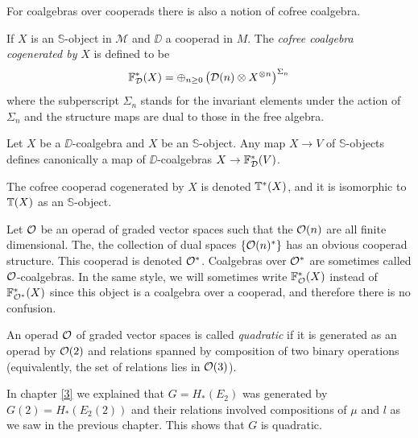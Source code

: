 \documentclass[TFM.tex]{subfiles}
\begin{document}
For coalgebras over cooperads there is also a notion of cofree coalgebra. 

\begin{defi}
If $X$ is an $\mathbb{S}$-object in $\mathscr{M}$ and $\DD$ a cooperad in $M$. The \emph{cofree coalgebra cogenerated by }$X$ is defined to be
\[
\mathbb{F}^*_{\mathcal{D}}(X)=\oplus_{n\geq 0}\left(\mathcal{D}(n)\otimes X^{\otimes n}\right)^{\Sigma_n}
\]
where the subperscript $\Sigma_n$ stands for the invariant elements under the action of $\Sigma_n$ and the structure maps are dual to those in the free algebra. %
\end{defi}



Let $X$ be a $\DD$-coalgebra and $X$ be an $\mathbb{S}$-object. Any map $X\to V$ of $\mathbb{S}$-objects defines canonically a map of $\DD$-coalgebras $X\to \mathbb{F}_{\mathcal{D}}^*(V)$.  

The cofree cooperad cogenerated by $X$ is denoted $\mathbb{T}^*(X)$, and it is isomorphic to $\mathbb{T}(X)$ as an $\mathbb{S}$-object. 

\begin{remark}\label{dual}
Let ${\mathcal O}$ be an operad of graded vector spaces such that the ${\mathcal O}(n)$ are all finite dimensional. The, the collection of dual spaces $\{{\mathcal O}(n)^*\}$ has an obvious cooperad structure. This cooperad is denoted ${\mathcal O}^*$. Coalgebras over ${\mathcal O}^*$ are sometimes called ${\mathcal O}$-coalgebras. In the same style, we will sometimes write $\mathbb{F}^*_{\mathcal O}(X)$ instead of $\mathbb{F}^*_{{\mathcal O}^*}(X)$ since this object is a coalgebra over a cooperad, and therefore there is no confusion.
\end{remark}

\begin{defi}
An operad ${\mathcal O}$ of graded vector spaces is called \emph{quadratic} if it is generated as an operad by ${\mathcal O}(2)$ and relations spanned by composition of two binary operations (equivalently, the set of relations lies in ${\mathcal O}(3)$). 
\end{defi}

In chapter \ref{3} we explained that $G=H_*(E_2)$ was generated by $G(2)=H_*(E_2(2))$ and their relations involved compositions of $\mu$ and $l$ as we saw in the previous chapter. This shows that $G$ is quadratic. %
\end{document}
